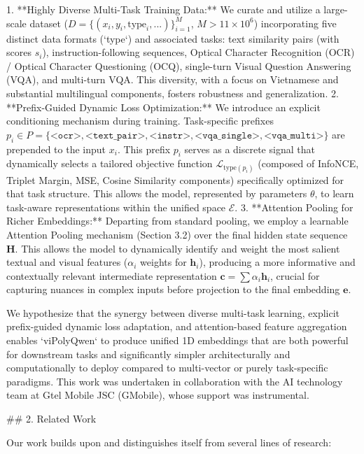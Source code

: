1.  **Highly Diverse Multi-Task Training Data:** We curate and utilize a large-scale dataset ($D = \{ (x_i, y_i, \text{type}_i, ... ) \}_{i=1}^{M}$, $M > 11 \times 10^6$) incorporating five distinct data formats (`type`) and associated tasks: text similarity pairs (with scores $s_i$), instruction-following sequences, Optical Character Recognition (OCR) / Optical Character Questioning (OCQ), single-turn Visual Question Answering (VQA), and multi-turn VQA. This diversity, with a focus on Vietnamese and substantial multilingual components, fosters robustness and generalization.
2.  **Prefix-Guided Dynamic Loss Optimization:** We introduce an explicit conditioning mechanism during training. Task-specific prefixes $p_i \in P = \{ \texttt{<ocr>}, \texttt{<text\_pair>}, \texttt{<instr>}, \texttt{<vqa\_single>}, \texttt{<vqa\_multi>} \}$ are prepended to the input $x_i$. This prefix $p_i$ serves as a discrete signal that dynamically selects a tailored objective function $\mathcal{L}_{\text{type}(p_i)}$ (composed of InfoNCE, Triplet Margin, MSE, Cosine Similarity components) specifically optimized for that task structure. This allows the model, represented by parameters $\theta$, to learn task-aware representations within the unified space $\mathcal{E}$.
3.  **Attention Pooling for Richer Embeddings:** Departing from standard pooling, we employ a learnable Attention Pooling mechanism (Section 3.2) over the final hidden state sequence $\mathbf{H}$. This allows the model to dynamically identify and weight the most salient textual and visual features ($\alpha_i$ weights for $\mathbf{h}_i$), producing a more informative and contextually relevant intermediate representation $\mathbf{c} = \sum \alpha_i \mathbf{h}_i$, crucial for capturing nuances in complex inputs before projection to the final embedding $\mathbf{e}$.

We hypothesize that the synergy between diverse multi-task learning, explicit prefix-guided dynamic loss adaptation, and attention-based feature aggregation enables `viPolyQwen` to produce unified 1D embeddings that are both powerful for downstream tasks and significantly simpler architecturally and computationally to deploy compared to multi-vector or purely task-specific paradigms. This work was undertaken in collaboration with the AI technology team at Gtel Mobile JSC (GMobile), whose support was instrumental.

## 2. Related Work

Our work builds upon and distinguishes itself from several lines of research:

